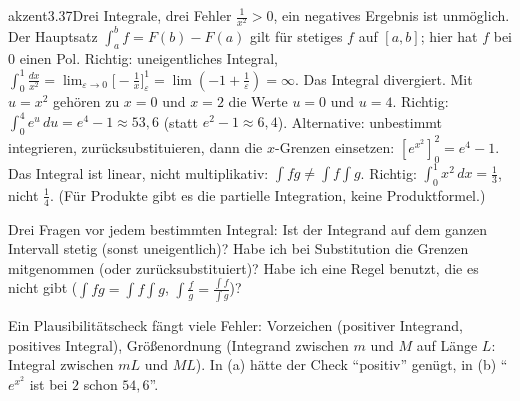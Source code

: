 \begin{loesungkarte}{akzent}{3.37}{Drei Integrale, drei Fehler}
$\frac1{x^{2}} > 0$, ein negatives Ergebnis ist unmöglich. Der Hauptsatz $\int_a^bf = F(b) - F(a)$ gilt für stetiges $f$ auf $[a, b]$; hier hat $f$ bei $0$ einen Pol. Richtig: uneigentliches Integral, $\int_0^1\frac{dx}{x^{2}} = \lim_{\varepsilon\to0}\bigl[-\frac1x\bigr]_\varepsilon^{1} = \lim(-1 + \frac1\varepsilon) = \infty$. Das Integral divergiert.
Mit $u = x^{2}$ gehören zu $x = 0$ und $x = 2$ die Werte $u = 0$ und $u = 4$. Richtig: $\int_0^4e^{u}\,du = e^{4} - 1\approx53{,}6$ (statt $e^{2} - 1\approx6{,}4$). Alternative: unbestimmt integrieren, zurücksubstituieren, dann die $x$-Grenzen einsetzen: $[e^{x^{2}}]_0^2 = e^{4} - 1$.
Das Integral ist linear, nicht multiplikativ: $\int fg\neq\int f\int g$. Richtig: $\int_0^1x^{2}\,dx = \frac13$, nicht $\frac14$. (Für Produkte gibt es die partielle Integration, keine Produktformel.)
\begin{fehler}\kastentext
Drei Fragen vor jedem bestimmten Integral: Ist der Integrand auf dem ganzen Intervall stetig (sonst uneigentlich)? Habe ich bei Substitution die Grenzen mitgenommen (oder zurücksubstituiert)? Habe ich eine Regel benutzt, die es nicht gibt ($\int fg = \int f\int g$, $\int\frac fg = \frac{\int f}{\int g}$)?
\end{fehler}
\begin{mitnehmen}\kastentext
Ein Plausibilitätscheck fängt viele Fehler: Vorzeichen (positiver Integrand, positives Integral), Größenordnung (Integrand zwischen $m$ und $M$ auf Länge $L$: Integral zwischen $mL$ und $ML$). In (a) hätte der Check \enquote{positiv} genügt, in (b) \enquote{$e^{x^{2}}$ ist bei $2$ schon $54{,}6$}.
\end{mitnehmen}
\end{loesungkarte}

